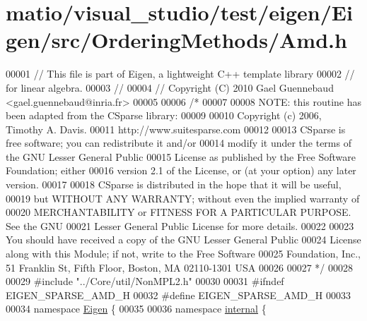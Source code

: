 \hypertarget{matio_2visual__studio_2test_2eigen_2_eigen_2src_2_ordering_methods_2_amd_8h_source}{}\section{matio/visual\+\_\+studio/test/eigen/\+Eigen/src/\+Ordering\+Methods/\+Amd.h}
\label{matio_2visual__studio_2test_2eigen_2_eigen_2src_2_ordering_methods_2_amd_8h_source}

\begin{DoxyCode}
00001 \textcolor{comment}{// This file is part of Eigen, a lightweight C++ template library}
00002 \textcolor{comment}{// for linear algebra.}
00003 \textcolor{comment}{//}
00004 \textcolor{comment}{// Copyright (C) 2010 Gael Guennebaud <gael.guennebaud@inria.fr>}
00005 
00006 \textcolor{comment}{/*}
00007 \textcolor{comment}{}
00008 \textcolor{comment}{NOTE: this routine has been adapted from the CSparse library:}
00009 \textcolor{comment}{}
00010 \textcolor{comment}{Copyright (c) 2006, Timothy A. Davis.}
00011 \textcolor{comment}{http://www.suitesparse.com}
00012 \textcolor{comment}{}
00013 \textcolor{comment}{CSparse is free software; you can redistribute it and/or}
00014 \textcolor{comment}{modify it under the terms of the GNU Lesser General Public}
00015 \textcolor{comment}{License as published by the Free Software Foundation; either}
00016 \textcolor{comment}{version 2.1 of the License, or (at your option) any later version.}
00017 \textcolor{comment}{}
00018 \textcolor{comment}{CSparse is distributed in the hope that it will be useful,}
00019 \textcolor{comment}{but WITHOUT ANY WARRANTY; without even the implied warranty of}
00020 \textcolor{comment}{MERCHANTABILITY or FITNESS FOR A PARTICULAR PURPOSE.  See the GNU}
00021 \textcolor{comment}{Lesser General Public License for more details.}
00022 \textcolor{comment}{}
00023 \textcolor{comment}{You should have received a copy of the GNU Lesser General Public}
00024 \textcolor{comment}{License along with this Module; if not, write to the Free Software}
00025 \textcolor{comment}{Foundation, Inc., 51 Franklin St, Fifth Floor, Boston, MA  02110-1301  USA}
00026 \textcolor{comment}{}
00027 \textcolor{comment}{*/}
00028 
00029 \textcolor{preprocessor}{#include "../Core/util/NonMPL2.h"}
00030 
00031 \textcolor{preprocessor}{#ifndef EIGEN\_SPARSE\_AMD\_H}
00032 \textcolor{preprocessor}{#define EIGEN\_SPARSE\_AMD\_H}
00033 
00034 \textcolor{keyword}{namespace }\hyperlink{namespace_eigen}{Eigen} \{ 
00035 
00036 \textcolor{keyword}{namespace }\hyperlink{namespaceinternal}{internal} \{

\end{DoxyCode}

